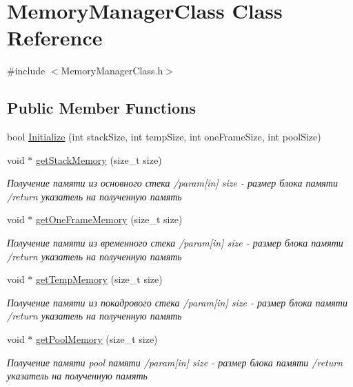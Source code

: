 \hypertarget{class_memory_manager_class}{}\section{Memory\+Manager\+Class Class Reference}
\label{class_memory_manager_class}


{\ttfamily \#include $<$Memory\+Manager\+Class.\+h$>$}

\subsection*{Public Member Functions}
\begin{DoxyCompactItemize}
\item 
bool \hyperlink{class_memory_manager_class_a7e9132ed8b0a1ba02aed364d507f635f}{Initialize} (int stack\+Size, int temp\+Size, int one\+Frame\+Size, int pool\+Size)
\item 
void $\ast$ \hyperlink{class_memory_manager_class_abd46a6a36966f417f0e54b8fc4d6d8b1}{get\+Stack\+Memory} (size\+\_\+t size)
\begin{DoxyCompactList}\small\item\em Получение памяти из основного стека /param\mbox{[}in\mbox{]} size -\/ размер блока памяти /return указатель на полученную память \end{DoxyCompactList}\item 
void $\ast$ \hyperlink{class_memory_manager_class_a9538dd34a176127732b15e29c20ef629}{get\+One\+Frame\+Memory} (size\+\_\+t size)
\begin{DoxyCompactList}\small\item\em Получение памяти из временного стека /param\mbox{[}in\mbox{]} size -\/ размер блока памяти /return указатель на полученную память \end{DoxyCompactList}\item 
void $\ast$ \hyperlink{class_memory_manager_class_a6818ba26e0f20964dbf3409396c56136}{get\+Temp\+Memory} (size\+\_\+t size)
\begin{DoxyCompactList}\small\item\em Получение памяти из покадрового стека /param\mbox{[}in\mbox{]} size -\/ размер блока памяти /return указатель на полученную память \end{DoxyCompactList}\item 
void $\ast$ \hyperlink{class_memory_manager_class_a66ed5036828511d3e123503edba0bfd5}{get\+Pool\+Memory} (size\+\_\+t size)
\begin{DoxyCompactList}\small\item\em Получение памяти pool памяти /param\mbox{[}in\mbox{]} size -\/ размер блока памяти /return указатель на полученную память \end{DoxyCompactList}\item 

\end{DoxyCompactItemize}
